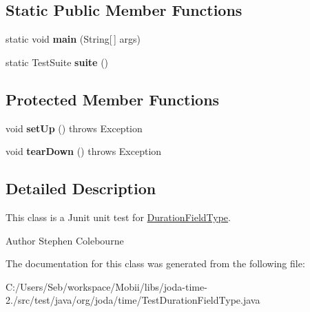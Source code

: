\subsection*{Static Public Member Functions}
\begin{DoxyCompactItemize}
\item 
\hypertarget{classorg_1_1joda_1_1time_1_1_test_duration_field_type_a5b35fa3f89edb0159086daea9f3fb677}{static void {\bfseries main} (String\mbox{[}$\,$\mbox{]} args)}\label{classorg_1_1joda_1_1time_1_1_test_duration_field_type_a5b35fa3f89edb0159086daea9f3fb677}

\item 
\hypertarget{classorg_1_1joda_1_1time_1_1_test_duration_field_type_aa17131d90eae54ec982455728a7a1aea}{static Test\-Suite {\bfseries suite} ()}\label{classorg_1_1joda_1_1time_1_1_test_duration_field_type_aa17131d90eae54ec982455728a7a1aea}

\end{DoxyCompactItemize}
\subsection*{Protected Member Functions}
\begin{DoxyCompactItemize}
\item 
\hypertarget{classorg_1_1joda_1_1time_1_1_test_duration_field_type_abacad37e4ced50e8ad92dff344cc3a24}{void {\bfseries set\-Up} ()  throws Exception }\label{classorg_1_1joda_1_1time_1_1_test_duration_field_type_abacad37e4ced50e8ad92dff344cc3a24}

\item 
\hypertarget{classorg_1_1joda_1_1time_1_1_test_duration_field_type_a5a2af047ecb94231d8b35e769eb0689f}{void {\bfseries tear\-Down} ()  throws Exception }\label{classorg_1_1joda_1_1time_1_1_test_duration_field_type_a5a2af047ecb94231d8b35e769eb0689f}

\end{DoxyCompactItemize}


\subsection{Detailed Description}
This class is a Junit unit test for \hyperlink{classorg_1_1joda_1_1time_1_1_duration_field_type}{Duration\-Field\-Type}.

\begin{DoxyAuthor}{Author}
Stephen Colebourne 
\end{DoxyAuthor}


The documentation for this class was generated from the following file\-:\begin{DoxyCompactItemize}
\item 
C\-:/\-Users/\-Seb/workspace/\-Mobii/libs/joda-\/time-\/2./src/test/java/org/joda/time/Test\-Duration\-Field\-Type.\-java\end{DoxyCompactItemize}
